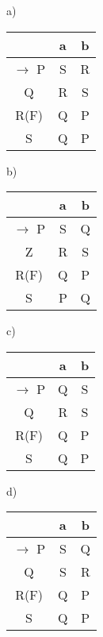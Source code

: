 \documentclass{article}
\begin{document}
\begin{multicols}{4}

a)
\begin{center}
\begin{tabular}{|c|c|c|}

\hline
  & a & b \\
\hline
$\rightarrow$ P & S & R \\
\hline
Q & R & S \\
\hline
R(F) & Q & P \\
\hline
S & Q & P \\
\hline

\end{tabular}
\end{center}

b)
\begin{center}
\begin{tabular}{|c|c|c|}

\hline
  & a & b \\
\hline
$\rightarrow$ P & S & Q \\
\hline
Z & R & S \\
\hline
R(F) & Q & P \\
\hline
S & P & Q \\
\hline

\end{tabular}
\end{center}

c)
\begin{center}
\begin{tabular}{|c|c|c|}

\hline
  & a & b \\
\hline
$\rightarrow$ P & Q & S \\
\hline
Q & R & S \\
\hline
R(F) & Q & P \\
\hline
S & Q & P \\
\hline

\end{tabular}
\end{center}

d)
\begin{center}
\begin{tabular}{|c|c|c|}

\hline
  & a & b \\
\hline
$\rightarrow$ P & S & Q \\
\hline
Q & S & R \\
\hline
R(F) & Q & P \\
\hline
S & Q & P \\
\hline

\end{tabular}
\end{center}

\end{multicols}
\end{document}
